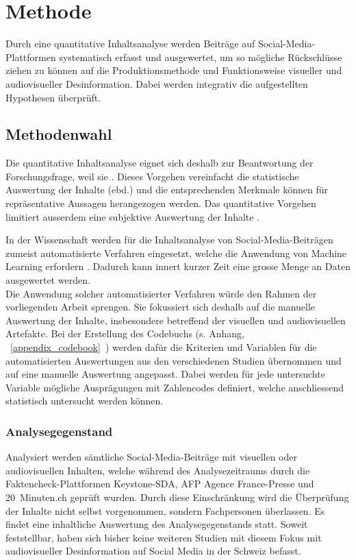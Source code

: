 \documentclass[12pt,a4paper]{article}        %
\begin{document}
\pagebreak
\section{Methode}
Durch eine quantitative Inhaltsanalyse werden Beiträge auf Social-Media-Plattformen systematisch erfasst und ausgewertet, um so mögliche Rückschlüsse ziehen zu können auf die Produktionsmethode und Funktionsweise visueller und audiovisueller Desinformation. Dabei werden integrativ \parencite[13]{oehmer-pedrazzi_standardisierte_2023} die aufgestellten Hypothesen überprüft.
\subsection{Methodenwahl}
Die quantitative Inhaltsanalyse eignet sich deshalb zur Beantwortung der Forschungsfrage, weil sie  \parencites[11]{oehmer-pedrazzi_standardisierte_2023}[vgl.\ auch][227]{lobinger_quantitative_2012}. Dieses Vorgehen vereinfacht die statistische Auswertung der Inhalte (ebd.) und die entsprechenden Merkmale können für repräsentative Aussagen herangezogen werden. Das quantitative Vorgehen limitiert ausserdem eine subjektive Auswertung der Inhalte \parencite[140]{lai_content_2015}.

In der Wissenschaft werden für die Inhaltsanalyse von Social-Media-Beiträgen zumeist automatisierte Verfahren eingesetzt, welche die Anwendung von Machine Learning erfordern \parencites[vgl.\ bspw.]{andreotta_analyzing_2019}{lai_content_2015}
{schwartz_data-driven_2015}{wilson_content_2022}{wang_video_2015}. Dadurch kann innert kurzer Zeit eine grosse Menge an Daten ausgewertet werden.\\
Die Anwendung solcher automatisierter Verfahren würde den Rahmen der vorliegenden Arbeit sprengen. Sie fokussiert sich deshalb auf die manuelle Auswertung der Inhalte, insbesondere betreffend der visuellen und audiovisuellen Artefakte. Bei der Erstellung des Codebuchs (s. Anhang, ~\ref{appendix_codebook}~) werden dafür die Kriterien und Variablen für die automatisierten Auswertungen aus den verschiedenen Studien übernommen und auf eine manuelle Auswertung angepasst. Dabei werden für jede untersuchte Variable mögliche Ausprägungen mit Zahlencodes definiert, welche anschliessend statistisch untersucht werden können.
\subsubsection{Analysegegenstand}
Analysiert werden sämtliche Social-Media-Beiträge mit visuellen oder audiovisuellen Inhalten, welche während des Analysezeitraums durch die Faktencheck-Plattformen Keystone-SDA, AFP Agence France-Presse und 20 Minuten.ch geprüft wurden. Durch diese Einschränkung wird die Überprüfung der Inhalte nicht selbst vorgenommen, sondern Fachpersonen überlassen. Es findet eine inhaltliche Auswertung des Analysegegenstands statt. Soweit feststellbar, haben sich bisher keine weiteren Studien mit diesem Fokus mit audiovisueller Desinformation auf Social Media in der Schweiz befasst.
\end{document}
